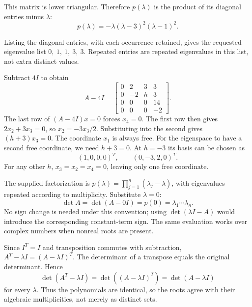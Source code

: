 This matrix is lower triangular. Therefore $p(\lambda)$ is the product of its diagonal entries minus $\lambda$:
\[ p(\lambda)=- \lambda \left(\lambda - 3\right)^{2} \left(\lambda - 1\right)^{2}.\]

Listing the diagonal entries, with each occurrence retained, gives the requested eigenvalue list $0,\ 1,\ 1,\ 3,\ 3$. Repeated entries are repeated eigenvalues in this list, not extra distinct values.


Subtract $4I$ to obtain
\[
 A-4I=\begin{bmatrix}0&2&3&3\\0&-2&h&3\\0&0&0&14\\0&0&0&-2\end{bmatrix}.
\]
The last row of $(A-4I)x=0$ forces $x_4=0$. The first row then
gives $2x_2+3x_3=0$, so $x_2=-3x_3/2$. Substituting into
the second gives $(h+3)x_3=0$. The coordinate $x_1$ is always free.
For the eigenspace to have a second free coordinate, we need
$h+3=0$. At $h=-3$ its basis can be chosen as
\[
 (1,0,0,0)^T,\qquad(0,-3,2,0)^T.
\]
For any other $h$, $x_3=x_2=x_4=0$, leaving only one free coordinate.

The supplied factorization is
$p(\lambda)=\prod_{j=1}^n(\lambda_j-\lambda)$, with eigenvalues
repeated according to multiplicity. Substitute $\lambda=0$:
\[
 \det A=\det(A-0I)=p(0)=\lambda_1\cdots\lambda_n.
\]
No sign change is needed under this convention; using
$\det(\lambda I-A)$ would introduce the corresponding constant-term sign.
The same evaluation works over complex numbers when nonreal roots are present.

Since $I^T=I$ and transposition commutes with subtraction,
$A^T-\lambda I=(A-\lambda I)^T$.
The determinant of a transpose equals the original determinant. Hence
\[
 \det(A^T-\lambda I)=\det((A-\lambda I)^T)=\det(A-\lambda I)
\]
for every $\lambda$. Thus the polynomials are identical, so the
roots agree with their algebraic multiplicities, not merely as distinct sets.


